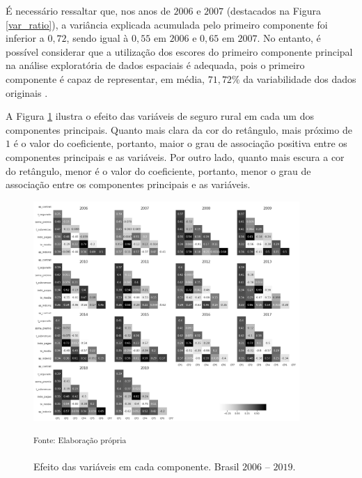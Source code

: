 É necessário ressaltar que, nos anos de $2006$ e $2007$ (destacados na Figura \ref{var_ratio}), a variância explicada acumulada pelo primeiro componente foi inferior a $0,72$, sendo igual à $0,55$ em $2006$ e $0,65$ em $2007$. No entanto, é possível considerar que a utilização dos escores do primeiro componente principal na análise exploratória de dados espaciais é adequada, pois o primeiro componente é capaz de representar, em média, $71,72\%$ da variabilidade dos dados originais \cite{everitt11}.


A Figura \ref{corr_pca_var} ilustra o efeito das variáveis de seguro rural em cada um dos componentes principais. Quanto mais clara da cor do retângulo, mais próximo de $1$ é o valor do coeficiente, portanto, maior o grau de associação positiva entre os componentes principais e as variáveis. Por outro lado, quanto mais escura a cor do retângulo, menor é o valor do coeficiente, portanto, menor o grau de associação entre os componentes principais e as variáveis.


\begin{figure}[H]
	\centering
	\caption{Efeito das variáveis em cada componente. Brasil $2006$ -- $2019$.}
	\includegraphics[width=0.9\textwidth]{figuras/corr_pca_var.png}	\parbox{\dimexpr\linewidth-2cm}{\raggedright
    \strut \textsuperscript{Fonte: Elaboração própria}\strut}
    \label{corr_pca_var}
\end{figure}

